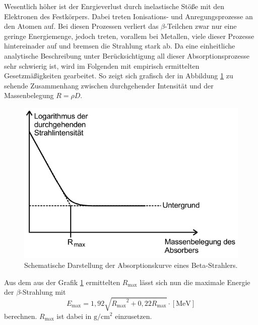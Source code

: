 Wesentlich höher ist der Enrgieverlust durch inelastische Stöße mit den Elektronen des Festkörpers. Dabei treten Ionisations- und Anregungsprozesse an den Atomen auf.
Bei diesen Prozessen verliert das $\beta$-Teilchen zwar nur eine geringe Energiemenge, jedoch treten, vorallem bei Metallen, viele dieser Prozesse hintereinader auf und
bremsen die Strahlung stark ab. Da eine einheitliche analytische Beschreibung unter Berücksichtigung all dieser Absorptionsprozesse sehr schwierig ist, wird im Folgenden
mit empirisch ermittelten Gesetzmäßigkeiten gearbeitet. So zeigt sich grafisch der in Abbildung \ref{fig:betaabsorption} zu sehende Zusammenhang zwischen durchgehender Intensität
und der Massenbelegung $R=\rho D$.
\begin{figure}
  \centering
  \includegraphics[scale=0.7]{pictures/betaabsorption.png}
  \caption{Schematische Darstellung der Absorptionskurve eines Beta-Strahlers.\cite{sample}}
  \label{fig:betaabsorption}
\end{figure}
Aus dem aus der Grafik \ref{fig:betaabsorption} ermittelten $R_\text{max}$ lässt sich nun die maximale Energie der $\beta$-Strahlung mit
\begin{equation}
  E_\text{max} = 1,92 \sqrt{{R_\text{max}}^2 + 0,22 R_\text{max}} \cdot [\si{\mega\electronvolt}]
  \label{eqn:betaenergie}
\end{equation}
berechnen. $R_\text{max}$ ist dabei in $\si{\gram\per\centi\metre\squared}$ einzusetzen.
